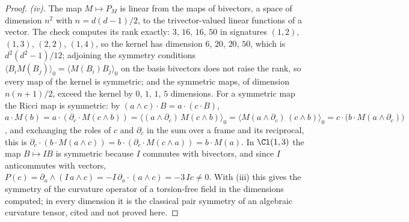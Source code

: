 \begin{proof}
\emph{(iv).} The map $M \mapsto P_{M}$ is linear from the maps of bivectors, a space of dimension $n^{2}$ with $n = d(d-1)/2$, to the trivector-valued linear functions of a vector. The check computes its rank exactly: $3$, $16$, $16$, $50$ in signatures $(1,2)$, $(1,3)$, $(2,2)$, $(1,4)$, so the kernel has dimension $6$, $20$, $20$, $50$, which is $d^{2}(d^{2}-1)/12$; adjoining the symmetry conditions $\langle B_{i}M(B_{j})\rangle_{0} = \langle M(B_{i})B_{j}\rangle_{0}$ on the basis bivectors does not raise the rank, so every map of the kernel is symmetric; and the symmetric maps, of dimension $n(n+1)/2$, exceed the kernel by $0$, $1$, $1$, $5$ dimensions. For a symmetric map the Ricci map is symmetric: by $(a\wedge c)\cdot B = a\cdot(c\cdot B)$, $a\cdot M(b) = a\cdot(\partial_{c}\cdot M(c\wedge b)) = \langle (a\wedge\partial_{c})\,M(c\wedge b)\rangle_{0} = \langle M(a\wedge\partial_{c})\,(c\wedge b)\rangle_{0} = c\cdot\bigl(b\cdot M(a\wedge\partial_{c})\bigr)$, and exchanging the roles of $c$ and $\partial_{c}$ in the sum over a frame and its reciprocal, this is $\partial_{c}\cdot(b\cdot M(a\wedge c)) = b\cdot(\partial_{c}\cdot M(c\wedge a)) = b\cdot M(a)$. In $\Cl(1,3)$ the map $B \mapsto I B$ is symmetric because $I$ commutes with bivectors, and since $I$ anticommutes with vectors, $P(c) = \partial_{a}\wedge(I\,a\wedge c) = -I\,\partial_{a}\cdot(a\wedge c) = -3\,I c \neq 0$. With (iii) this gives the symmetry of the curvature operator of a torsion-free field in the dimensions computed; in every dimension it is the classical pair symmetry of an algebraic curvature tensor, cited and not proved here.
\end{proof}
